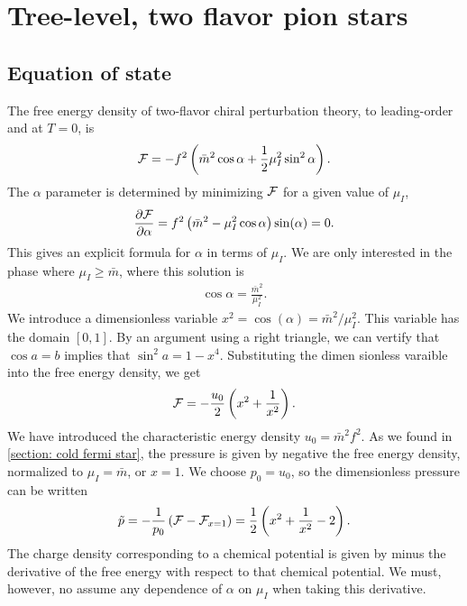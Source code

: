 \section{Tree-level, two flavor pion stars}


\subsection{Equation of state}
The free energy density of two-flavor chiral perturbation theory, to leading-order and at $T = 0$, is
%
\begin{equation}
    \mathcal{F} = - f^2 \left(\bar m^2 \cos \alpha + \frac{1}{2} \mu_I^2 \sin^2 \alpha\right).
\end{equation}
%
The $\alpha$ parameter is determined by minimizing $\mathcal{F}$ for a given value of $\mu_I$,
%
\begin{equation}
    \pdv{\mathcal{F}}{\alpha} = f^2 \left(\bar m^2 - \mu_I^2 \cos \alpha\right) \sin(\alpha) = 0.
\end{equation}
%
This gives an explicit formula for $\alpha$ in terms of $\mu_I$.
We are only interested in the phase where $\mu_I \geq \bar m$, where this solution is
%
\begin{align}
    \label{alpha as function of mu lowest order}
    \cos \alpha = \frac{\bar m^2}{\mu_I^2}.
\end{align}
%
We introduce a dimensionless variable $x^2 = \cos(\alpha) = \bar m^2 / \mu_I^2$.
This variable has the domain $[0, 1]$.
By an argument using a right triangle, we can vertify that $\cos a = b$ implies that $\sin^2 a = 1 - x^4$.
Substituting the dimen sionless varaible into the free energy density, we get 
%
\begin{equation}
    \mathcal{F} = - \frac{u_0}{2} \left( x^2 + \frac{1}{x^2} \right).
\end{equation}
%
We have introduced the characteristic energy density $u_0 = \bar m^2 f^2$.
As we found in \autoref{section: cold fermi star}, the pressure is given by negative the free energy density, normalized to $\mu_I = \bar m$, or $x = 1$.
We choose $p_0 = u_0$, so the dimensionless pressure can be written
%
\begin{equation}
    \tilde p = -\frac{1}{p_0} \left(\mathcal{F} - \mathcal{F}_{x=1}\right) 
    = \frac{1}{2} \left( x^2 + \frac{1}{x^2} - 2 \right).
\end{equation}
%
The charge density corresponding to a chemical potential is given by minus the derivative of the free energy with respect to that chemical potential. 
We must, however, no assume any dependence of $\alpha$ on $\mu_I$ when taking this derivative.
